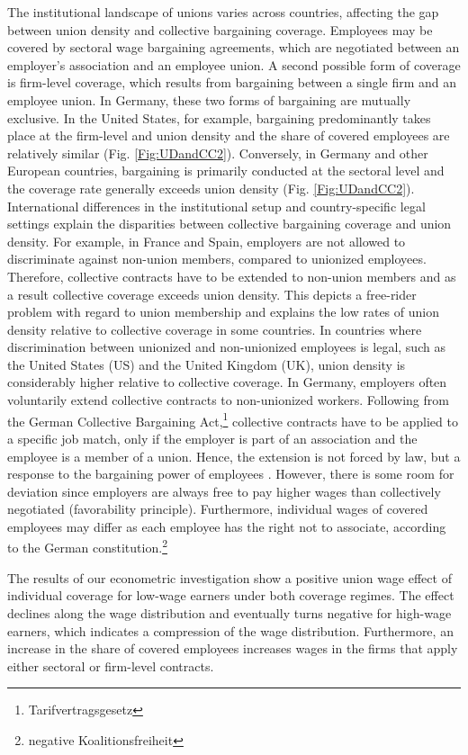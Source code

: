 The institutional landscape of unions varies across countries, affecting the gap between union density and collective bargaining coverage. Employees may be covered by sectoral wage bargaining agreements, which are negotiated between an employer's association and an employee union. A second possible form of coverage is firm-level coverage, which results from bargaining between a single firm and an employee union. In Germany, these two forms of bargaining are mutually exclusive. In the United States, for example,  bargaining predominantly takes place at the firm-level and union density and the share of covered employees are relatively similar (Fig. \ref{Fig:UDandCC2}). Conversely, in Germany and other European countries, bargaining is primarily conducted at the sectoral level and the coverage rate generally exceeds union density (Fig. \ref{Fig:UDandCC2}). International differences in the institutional setup and country-specific legal settings explain the disparities between collective bargaining coverage and union density. For example, in France and Spain, employers are not allowed to discriminate against non-union members, compared to unionized employees. Therefore, collective contracts have to be extended to non-union members and as a result collective coverage exceeds union density. This depicts a free-rider problem with regard to union membership and explains the low rates of union density relative to collective coverage in some countries. In countries where discrimination between unionized and non-unionized employees is legal, such as the United States (US) and the United Kingdom (UK), union density is considerably higher relative to collective coverage. In Germany, employers often voluntarily extend collective contracts to non-unionized workers. Following from the German Collective Bargaining Act,\footnote{ Tarifvertragsgesetz} collective contracts have to be applied to a specific job match, only if the employer is part of an association and the employee is a member of a union. Hence, the extension is not forced by law, but a response to the bargaining power of employees \citep{Fitzenberger&Kohn&Lembcke:13}. However, there is some room for deviation since employers are always free to pay higher wages than collectively negotiated (favorability principle). Furthermore, individual wages of covered employees may differ as each employee has the right not to associate, according to the German constitution.\footnote{ negative Koalitionsfreiheit}

The results of our econometric investigation show a positive union wage effect of individual coverage for low-wage earners under both coverage regimes. The effect declines along the wage distribution and eventually turns negative for high-wage earners, which indicates a compression of the wage distribution. Furthermore, an increase in the share of covered employees increases wages in the firms that apply either sectoral or firm-level contracts.

